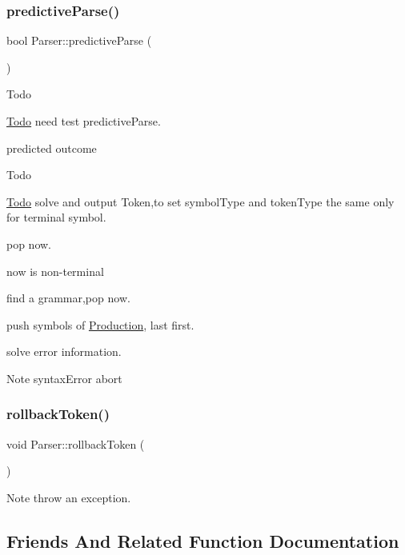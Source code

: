 \subsubsection{\texorpdfstring{predictive\+Parse()}{predictiveParse()}}
{\footnotesize\ttfamily bool Parser\+::predictive\+Parse (\begin{DoxyParamCaption}{ }\end{DoxyParamCaption})}

\begin{DoxyRefDesc}{Todo}
\item[\hyperlink{todo__todo000002}{Todo}]need test predictive\+Parse. \end{DoxyRefDesc}
predicted outcome

\begin{DoxyRefDesc}{Todo}
\item[\hyperlink{todo__todo000003}{Todo}]solve and output Token,to set symbol\+Type and token\+Type the same only for terminal symbol. \end{DoxyRefDesc}


pop now.

now is non-\/terminal

find a grammar,pop now.

push symbols of \hyperlink{class_production}{Production}, last first.

solve error information.

\begin{DoxyNote}{Note}
syntax\+Error abort 
\end{DoxyNote}
\hypertarget{class_parser_aba97a915de87d7df659a484cf8b196d8}{}\label{class_parser_aba97a915de87d7df659a484cf8b196d8} 
\subsubsection{\texorpdfstring{rollback\+Token()}{rollbackToken()}}
{\footnotesize\ttfamily void Parser\+::rollback\+Token (\begin{DoxyParamCaption}{ }\end{DoxyParamCaption})\hspace{0.3cm}{\ttfamily [noexcept]}}

\begin{DoxyNote}{Note}
throw an exception. 
\end{DoxyNote}


\subsection{Friends And Related Function Documentation}
\hypertarget{class_parser_a2b52de0ab06881c5f9906812aaaca3cb}{}\label{class_parser_a2b52de0ab06881c5f9906812aaaca3cb} 
